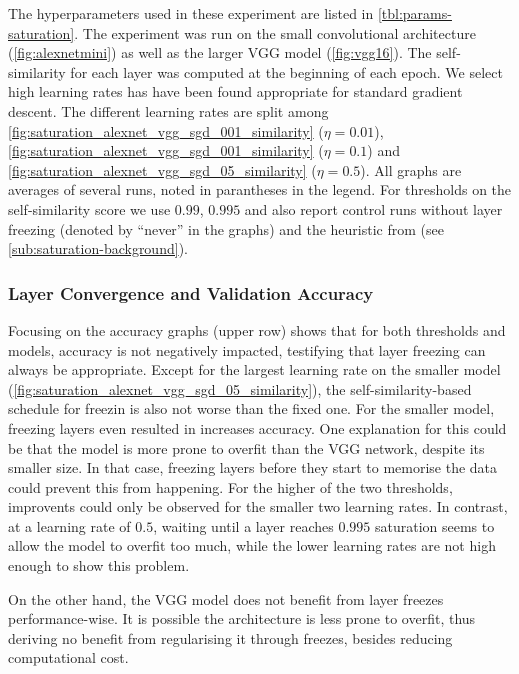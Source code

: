 The hyperparameters used in these experiment are listed in
\cref{tbl:params-saturation}.  The experiment was run on the small convolutional
architecture (\cref{fig:alexnetmini}) as well as the larger VGG model
(\cref{fig:vgg16}). The self-similarity for each layer was computed at the
beginning of each epoch. We select high learning rates has have been found
appropriate for standard gradient descent. The different learning rates are
split among \cref{fig:saturation_alexnet_vgg_sgd_001_similarity} ($\eta = 0.01$),
\cref{fig:saturation_alexnet_vgg_sgd_001_similarity} ($\eta = 0.1$) and
\cref{fig:saturation_alexnet_vgg_sgd_05_similarity} ($\eta = 0.5$). All graphs are averages
of several runs, noted in parantheses in the legend. For thresholds on the
self-similarity score we use $0.99$, $0.995$ and also report control runs
without layer freezing (denoted by ``never'' in the graphs) and the heuristic
from \citep{raghu2017svcca} (see \cref{sub:saturation-background}).

\subsubsection{Layer Convergence and Validation Accuracy}

Focusing on the accuracy graphs (upper row) shows that for both thresholds and
models, accuracy is not negatively impacted, testifying that layer freezing can
always be appropriate. Except for the largest learning rate on the smaller model
(\cref{fig:saturation_alexnet_vgg_sgd_05_similarity}), the self-similarity-based
schedule for freezin is also not worse than the fixed one. For the smaller
model, freezing layers even resulted in increases accuracy. One explanation for
this could be that the model is more prone to overfit than the VGG network,
despite its smaller size. In that case, freezing layers before they start to
memorise the data could prevent this from happening.  For the higher of the two
thresholds, improvents could only be observed for the smaller two learning
rates. In contrast, at a learning rate of $0.5$, waiting until a layer reaches
$0.995$ saturation seems to allow the model to overfit too much, while the lower
learning rates are not high enough to show this problem.

On the other hand, the VGG model does not benefit from layer freezes
performance-wise. It is possible the architecture is less prone to overfit, thus
deriving no benefit from regularising it through freezes, besides reducing
computational cost.

